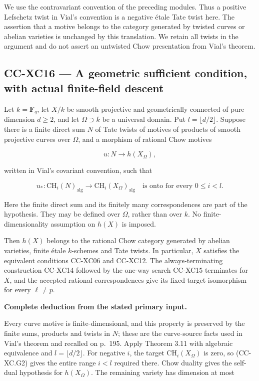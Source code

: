 We use the contravariant convention of the preceding modules. Thus a
positive Lefschetz twist in Vial's convention is a negative étale Tate
twist here. The assertion that a motive belongs to the category
generated by twisted curves or abelian varieties is unchanged by this
translation. We retain all twists in the argument and do not assert an
untwisted Chow presentation from Vial's theorem.

\subsection{CC-XC16 --- A geometric sufficient condition, with actual
finite-field
descent}\label{cc-xc16-a-geometric-sufficient-condition-with-actual-finite-field-descent}

Let \(k=\mathbf F_q\), let \(X/k\) be smooth projective and
geometrically connected of pure dimension \(d\ge2\), and let
\(\Omega\supset\bar k\) be a universal domain. Put
\(l=\lfloor d/2\rfloor\). Suppose there is a finite direct sum \(N\) of
Tate twists of motives of products of smooth projective curves over
\(\Omega\), and a morphism of rational Chow motives

\[
                 u:N\longrightarrow h(X_\Omega),
 \tag{CC-XC.G1}
\]

written in Vial's covariant convention, such that

\[
 u_*:\mathrm{CH}_i(N)_{\mathrm{alg}}
       \longrightarrow \mathrm{CH}_i(X_\Omega)_{\mathrm{alg}}
 \quad\text{is onto for every }0\le i<l.
 \tag{CC-XC.G2}
\]

Here the finite direct sum and its finitely many correspondences are
part of the hypothesis. They may be defined over \(\Omega\), rather than
over \(k\). No finite-dimensionality assumption on \(h(X)\) is imposed.

Then \(h(X)\) belongs to the rational Chow category generated by abelian
varieties, finite étale \(k\)-schemes and Tate twists. In particular,
\(X\) satisfies the equivalent conditions CC-XC06 and CC-XC12. The
always-terminating construction CC-XC14 followed by the one-way search
CC-XC15 terminates for \(X\), and the accepted rational correspondences
give its fixed-target isomorphism for every \(\ell\ne p\).

\textbf{Complete deduction from the stated primary input.}

Every curve motive is finite-dimensional, and this property is preserved
by the finite sums, products and twists in \(N\); these are the
curve-source facts used in Vial's theorem and recalled on p.~195. Apply
Theorem 3.11 with algebraic equivalence and \(l=\lfloor d/2\rfloor\).
For negative \(i\), the target \(\mathrm{CH}_i(X_\Omega)\) is zero, so
(CC-XC.G2) gives the entire range \(i<l\) required there. Chow duality
gives the self-dual hypothesis for \(h(X_\Omega)\). The remaining
variety has dimension at most

